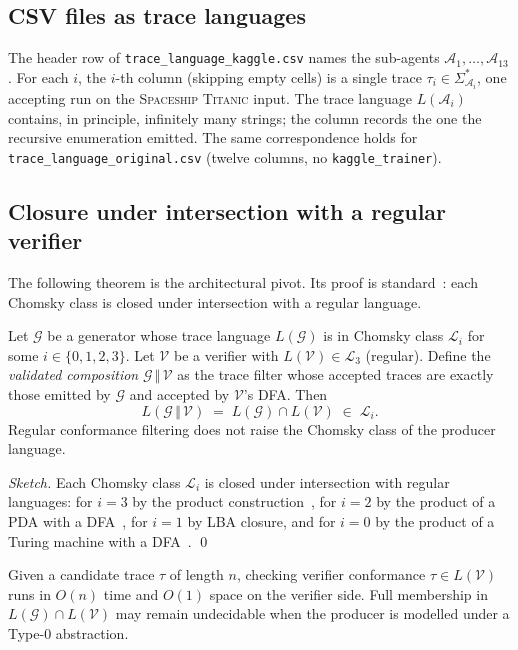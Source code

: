 \subsection{CSV files as trace languages}

The header row of \texttt{trace\_language\_kaggle.csv} names the
sub-agents $\mathcal{A}_1,\dots,\mathcal{A}_{13}$.  For each $i$,
the $i$-th column (skipping empty cells) is a single trace
$\tau_i \in \Sigma_{\mathcal{A}_i}^*$, one accepting run on the
\textsc{Spaceship Titanic} input.  The trace language
$L(\mathcal{A}_i)$ contains, in principle, infinitely many strings;
the column records the one the recursive enumeration emitted.
The same correspondence holds for
\texttt{trace\_language\_original.csv} (twelve columns, no
\texttt{kaggle\_trainer}).

\subsection{Closure under intersection with a regular verifier}

The following theorem is the architectural pivot.  Its proof is
standard~\cite{hopcroft2006automata}: each Chomsky class is closed
under intersection with a regular language.

\begin{theorem}
\label{thm:closure}
Let $\mathcal{G}$ be a generator whose trace language
$L(\mathcal{G})$ is in Chomsky class $\mathcal{L}_i$ for some
$i\in\{0,1,2,3\}$.  Let $\mathcal{V}$ be a verifier with
$L(\mathcal{V}) \in \mathcal{L}_3$ (regular).  Define the
\emph{validated composition} $\mathcal{G}\,\Vert\,\mathcal{V}$ as
the trace filter whose accepted traces are exactly those emitted by
$\mathcal{G}$ and accepted by $\mathcal{V}$'s DFA.  Then
\[
L(\mathcal{G}\,\Vert\,\mathcal{V})
\;=\; L(\mathcal{G}) \cap L(\mathcal{V})
\;\in\; \mathcal{L}_i.
\]
Regular conformance filtering does not raise the Chomsky class of
the producer language.
\end{theorem}

\begin{proof}[Sketch]
Each Chomsky class $\mathcal{L}_i$ is closed under intersection with
regular languages: for $i=3$ by the product
construction~\cite{rabin1959finite}, for $i=2$ by the product of a
PDA with a DFA~\cite{hopcroft2006automata}, for $i=1$ by LBA
closure, and for $i=0$ by the product of a Turing machine with a
DFA~\cite{turing1936computable}.
\qed
\end{proof}

\begin{corollary}
\label{cor:budget}
Given a candidate trace $\tau$ of length $n$, checking verifier
conformance $\tau \in L(\mathcal{V})$ runs in $O(n)$ time and
$O(1)$ space on the verifier side.  Full membership in
$L(\mathcal{G})\cap L(\mathcal{V})$ may remain undecidable when the
producer is modelled under a Type-0 abstraction.
\end{corollary}
